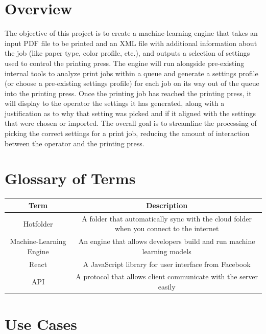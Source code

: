 \documentclass[onecolumn, draftclsnofoot,10pt, compsoc]{IEEEtran}
\begin{document}
\clearpage

\section{Overview}
The objective of this project is to create a machine-learning engine that takes an input PDF file to be printed and an XML file with additional information about the job (like paper type, color profile, etc.), and outputs a selection of settings used to control the printing press. The engine will run alongside pre-existing internal tools to analyze print jobs within a queue and generate a settings profile (or choose a pre-existing settings profile) for each job on its way out of the queue into the printing press. Once the printing job has reached the printing press, it will display to the operator the settings it has generated, along with a justification as to why that setting was picked and if it aligned with the settings that were chosen or imported. The overall goal is to streamline the processing of picking the correct settings for a print job, reducing the amount of interaction between the operator and the printing press.

\bigskip
\section{Glossary of Terms}
\begin{center}
\begin{tabular}{|c|c|}
  \hline
  Term & Description\\
  \hline
  Hotfolder  & A folder that automatically sync with the cloud folder when you connect to the internet\\ 
  \hline
  Machine-Learning Engine   & An engine that allows developers build and run machine learning models\\
  \hline
  React & A JavaScript library for user interface from Facebook\\
  \hline
  API & A protocol that allows client communicate with the server easily\\
  \hline
\end{tabular}
\end{center}

\bigskip
\section{Use Cases}
\end{document}
